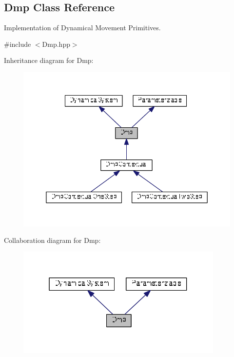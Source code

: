 \hypertarget{classDmpBbo_1_1Dmp}{\subsection{Dmp Class Reference}
\label{classDmpBbo_1_1Dmp}
}


Implementation of Dynamical Movement Primitives.  




{\ttfamily \#include $<$Dmp.\+hpp$>$}



Inheritance diagram for Dmp\+:
\nopagebreak
\begin{figure}[H]
\begin{center}
\leavevmode
\includegraphics[width=350pt]{classDmpBbo_1_1Dmp__inherit__graph}
\end{center}
\end{figure}


Collaboration diagram for Dmp\+:
\nopagebreak
\begin{figure}[H]
\begin{center}
\leavevmode
\includegraphics[width=292pt]{classDmpBbo_1_1Dmp__coll__graph}
\end{center}
\end{figure}
